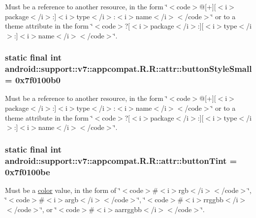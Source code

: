 Must be a reference to another resource, in the form \char`\"{}$<$code$>$@\mbox{[}+\mbox{]}\mbox{[}$<$i$>$package$<$/i$>$:\mbox{]}$<$i$>$type$<$/i$>$:$<$i$>$name$<$/i$>$$<$/code$>$\char`\"{} or to a theme attribute in the form \char`\"{}$<$code$>$?\mbox{[}$<$i$>$package$<$/i$>$:\mbox{]}\mbox{[}$<$i$>$type$<$/i$>$:\mbox{]}$<$i$>$name$<$/i$>$$<$/code$>$\char`\"{}. \hypertarget{classandroid_1_1support_1_1v7_1_1appcompat_1_1_r_1_1attr_fee250bae7d7eefc571d286c08027751}{
\subsubsection[{buttonStyleSmall}]{\setlength{\rightskip}{0pt plus 5cm}static final int android::support::v7::appcompat.R.R::attr::buttonStyleSmall = 0x7f0100b0}}
\label{classandroid_1_1support_1_1v7_1_1appcompat_1_1_r_1_1attr_fee250bae7d7eefc571d286c08027751}


Must be a reference to another resource, in the form \char`\"{}$<$code$>$@\mbox{[}+\mbox{]}\mbox{[}$<$i$>$package$<$/i$>$:\mbox{]}$<$i$>$type$<$/i$>$:$<$i$>$name$<$/i$>$$<$/code$>$\char`\"{} or to a theme attribute in the form \char`\"{}$<$code$>$?\mbox{[}$<$i$>$package$<$/i$>$:\mbox{]}\mbox{[}$<$i$>$type$<$/i$>$:\mbox{]}$<$i$>$name$<$/i$>$$<$/code$>$\char`\"{}. \hypertarget{classandroid_1_1support_1_1v7_1_1appcompat_1_1_r_1_1attr_3f9979e459254abc7c58ece1d6fa005d}{
\subsubsection[{buttonTint}]{\setlength{\rightskip}{0pt plus 5cm}static final int android::support::v7::appcompat.R.R::attr::buttonTint = 0x7f0100be}}
\label{classandroid_1_1support_1_1v7_1_1appcompat_1_1_r_1_1attr_3f9979e459254abc7c58ece1d6fa005d}


Must be a \hyperlink{classandroid_1_1support_1_1v7_1_1appcompat_1_1_r_1_1color}{color} value, in the form of \char`\"{}$<$code$>$\#$<$i$>$rgb$<$/i$>$$<$/code$>$\char`\"{}, \char`\"{}$<$code$>$\#$<$i$>$argb$<$/i$>$$<$/code$>$\char`\"{}, \char`\"{}$<$code$>$\#$<$i$>$rrggbb$<$/i$>$$<$/code$>$\char`\"{}, or \char`\"{}$<$code$>$\#$<$i$>$aarrggbb$<$/i$>$$<$/code$>$\char`\"{}. 

